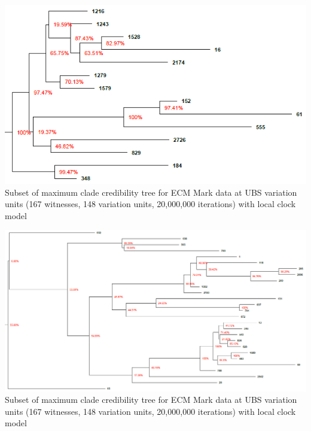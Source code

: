 \documentclass[10pt]{beamer}
\begin{document}
	\begin{frame}
		\begin{center}
			\includegraphics[width=\textwidth]{../img/ecm_mark_local_max_clade_credibility_tree_family_1216.png}\\
			Subset of maximum clade credibility tree for ECM Mark data at UBS variation units (167 witnesses, 148 variation units, 20,000,000 iterations) with local clock model\\
		\end{center}
	\end{frame}
	\begin{frame}
		\begin{center}
			\includegraphics[width=\textwidth]{../img/ecm_mark_local_max_clade_credibility_tree_caesarean.png}\\
			Subset of maximum clade credibility tree for ECM Mark data at UBS variation units (167 witnesses, 148 variation units, 20,000,000 iterations) with local clock model\\
		\end{center}
	\end{frame}
\end{document}
